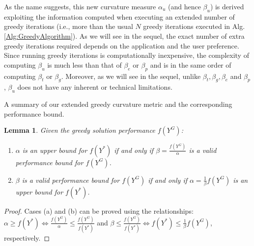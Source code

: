 \documentclass[letterpaper, 10 pt, conference]{ieeeconf}
\newtheorem{lemma}{Lemma}
\begin{document}
{As the name suggests, this new curvature measure $\alpha_u$ (and hence $\beta_u$) is derived exploiting the information computed when executing an extended number of greedy iterations (i.e., more than the usual $N$ greedy iterations executed in Alg. \ref{Alg:GreedyAlgorithm}). As we will see in the sequel, the exact number of extra greedy iterations required depends on the application and the user preference. Since running greedy iterations is computationally inexpensive, the complexity of computing $\beta_u$ is much less than that of $\beta_e$ or $\beta_p$ and is in the same order of computing $\beta_t$ or $\beta_g$. Moreover, as we will see in the sequel, unlike  $\beta_t,\beta_g,\beta_e$ and $\beta_p$, $\beta_u$ does not have any inherent or technical limitations. 


{\color{blue} A summary of our extended greedy curvature metric and the corresponding performance bound. }


\begin{lemma}\label{Lm:UpperBoundVsPerformanceBound}
Given the greedy solution performance $f(Y^G)$: 
\begin{enumerate}
    \item $\alpha$ is an upper bound for $f(Y^*)$ if and only if 
    $\beta = \frac{f(Y^G)}{\alpha}$ is a valid performance bound for $f(Y^G)$.
    \item $\beta$ is a valid performance bound for $f(Y^G)$ if and only if $\alpha = \frac{1}{\beta}f(Y^G)$ is an upper bound for $f(Y^*)$.
\end{enumerate} 
\end{lemma}
\begin{proof}
Cases (a) and (b) can be proved using the relationships: $\alpha \geq f(Y^*) \iff \frac{f(Y^G)}{\alpha} \leq \frac{f(Y^G)}{f(Y^*)}$ and $\beta \leq \frac{f(Y^G)}{f(Y^*)} \iff f(Y^*) \leq \frac{1}{\beta}f(Y^G)$, respectively.
\end{proof}





}
\end{document}
